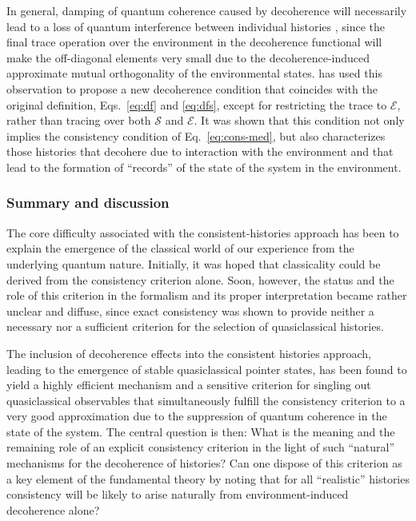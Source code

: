 \documentclass[twocolumn,rmp,aps,amsmath,amsfonts,noshowkeys,noshowpacs]{revtex4}
\begin{document}
In general, damping of quantum coherence caused by decoherence will
necessarily lead to a loss of quantum interference between individual
histories \citep[but not vice versa---see the discussion
by][]{Twamley:1993:bz}, since the final trace operation over the
environment in the decoherence functional will make the off-diagonal
elements very small due to the decoherence-induced approximate mutual
orthogonality of the environmental states.
\citet{Finkelstein:1993:gc} has used this observation to propose a new
decoherence condition that coincides with the original definition,
Eqs.~\eqref{eq:df} and \eqref{eq:dfs}, except for restricting the
trace to $\mathcal{E}$, rather than tracing over both $\mathcal{S}$
and $\mathcal{E}$. It was shown that this condition not only implies
the consistency condition of Eq.~\eqref{eq:cons-med}, but also
characterizes those histories that decohere due to interaction with
the environment and that lead to the formation of ``records'' of the
state of the system in the environment.


\subsubsection{Summary and discussion}

The core difficulty associated with the consistent-histories approach
has been to explain the emergence of the classical world of our
experience from the underlying quantum nature. Initially, it was hoped
that classicality could be derived from the consistency criterion
alone.  Soon, however, the status and the role of this criterion in
the formalism and its proper interpretation became rather unclear and
diffuse, since exact consistency was shown to provide neither a
necessary nor a sufficient criterion for the selection of
quasiclassical histories.

The inclusion of decoherence effects into the consistent histories
approach, leading to the emergence of stable quasiclassical pointer
states, has been found to yield a highly efficient mechanism and a
sensitive criterion for singling out quasiclassical observables that
simultaneously fulfill the consistency criterion to a very good
approximation due to the suppression of quantum coherence in the state
of the system. The central question is then: What is the meaning and
the remaining role of an explicit consistency criterion in the light
of such ``natural'' mechanisms for the decoherence of histories? Can
one dispose of this criterion as a key element of the fundamental
theory by noting that for all ``realistic'' histories consistency will
be likely to arise naturally from environment-induced decoherence
alone?
\end{document}

